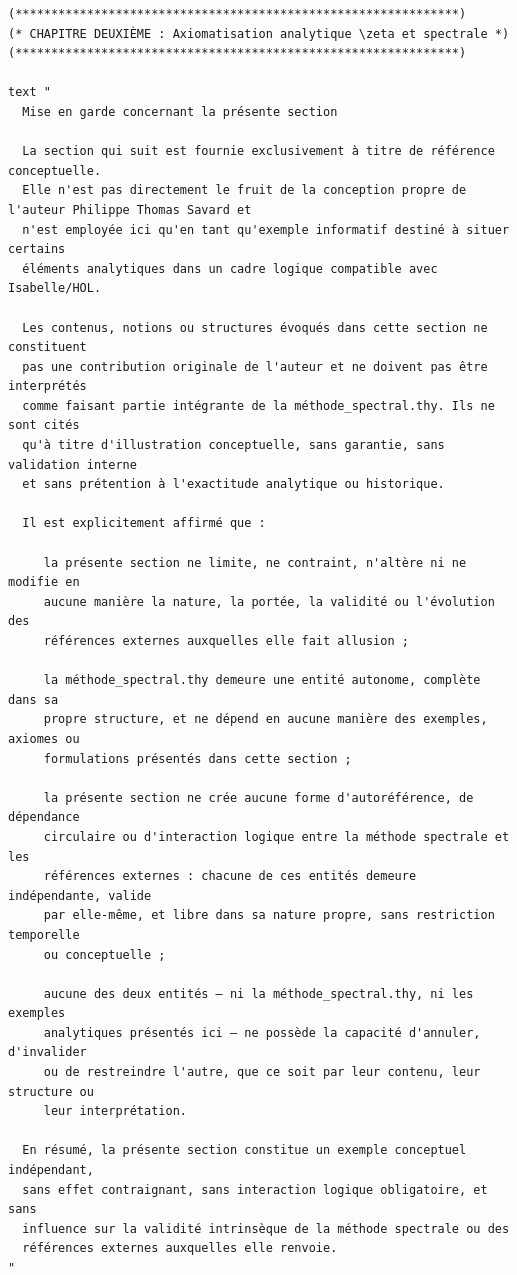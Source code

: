 \documentclass[a4paper,11pt]{article}
\begin{document}
\begin{holcode}[title={\textcolor{white}{Fichier : methode\_spectral.thy -- Partie 6/6 (FIN)}}]
\begin{lstlisting}
(**************************************************************)
(* CHAPITRE DEUXIÈME : Axiomatisation analytique \zeta et spectrale *)
(**************************************************************)

text "
  Mise en garde concernant la présente section

  La section qui suit est fournie exclusivement à titre de référence conceptuelle.
  Elle n'est pas directement le fruit de la conception propre de l'auteur Philippe Thomas Savard et
  n'est employée ici qu'en tant qu'exemple informatif destiné à situer certains
  éléments analytiques dans un cadre logique compatible avec Isabelle/HOL.

  Les contenus, notions ou structures évoqués dans cette section ne constituent
  pas une contribution originale de l'auteur et ne doivent pas être interprétés
  comme faisant partie intégrante de la méthode_spectral.thy. Ils ne sont cités
  qu'à titre d'illustration conceptuelle, sans garantie, sans validation interne
  et sans prétention à l'exactitude analytique ou historique.

  Il est explicitement affirmé que :

     la présente section ne limite, ne contraint, n'altère ni ne modifie en
     aucune manière la nature, la portée, la validité ou l'évolution des
     références externes auxquelles elle fait allusion ;

     la méthode_spectral.thy demeure une entité autonome, complète dans sa
     propre structure, et ne dépend en aucune manière des exemples, axiomes ou
     formulations présentés dans cette section ;

     la présente section ne crée aucune forme d'autoréférence, de dépendance
     circulaire ou d'interaction logique entre la méthode spectrale et les
     références externes : chacune de ces entités demeure indépendante, valide
     par elle-même, et libre dans sa nature propre, sans restriction temporelle
     ou conceptuelle ;

     aucune des deux entités — ni la méthode_spectral.thy, ni les exemples
     analytiques présentés ici — ne possède la capacité d'annuler, d'invalider
     ou de restreindre l'autre, que ce soit par leur contenu, leur structure ou
     leur interprétation.

  En résumé, la présente section constitue un exemple conceptuel indépendant,
  sans effet contraignant, sans interaction logique obligatoire, et sans
  influence sur la validité intrinsèque de la méthode spectrale ou des
  références externes auxquelles elle renvoie.
"


\end{lstlisting}
\end{holcode}
\end{document}
